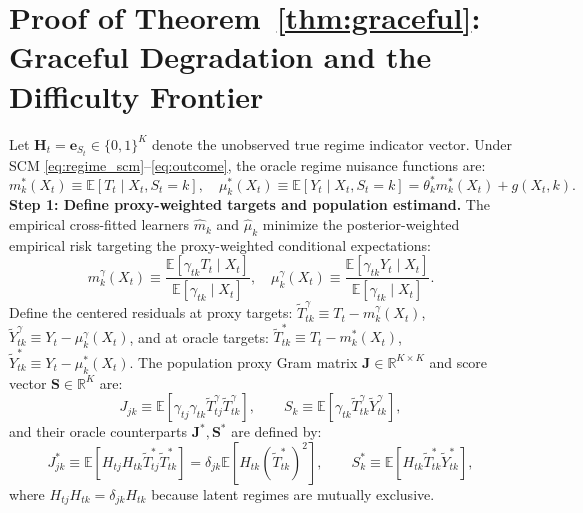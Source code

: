 \documentclass[twoside]{article}
\theoremstyle{definition}
\newcommand{\E}{\mathbb{E}}
\newcommand{\R}{\mathbb{R}}
\begin{document}
\section{Proof of Theorem~\ref{thm:graceful}: Graceful Degradation and the Difficulty Frontier}
\label{app:proof_thm3}
Let $\boldsymbol{H}_t = \boldsymbol{e}_{S_t} \in \{0, 1\}^K$ denote the unobserved true regime indicator vector.
Under SCM \eqref{eq:regime_scm}--\eqref{eq:outcome}, the oracle regime nuisance functions are:
\begin{equation}
    m_k^*(X_t) \equiv \E[T_t \mid X_t, S_t = k], \quad \mu_k^*(X_t) \equiv \E[Y_t \mid X_t, S_t = k] = \theta_k^* m_k^*(X_t) + g(X_t, k).
\end{equation}
\textbf{Step 1: Define proxy-weighted targets and population estimand.}
The empirical cross-fitted learners $\hat{m}_k$ and $\hat{\mu}_k$ minimize the posterior-weighted empirical risk targeting the proxy-weighted conditional expectations:
\begin{equation}
    m_k^\gamma(X_t) \equiv \frac{\E[\gamma_{tk} T_t \mid X_t]}{\E[\gamma_{tk} \mid X_t]}, \quad \mu_k^\gamma(X_t) \equiv \frac{\E[\gamma_{tk} Y_t \mid X_t]}{\E[\gamma_{tk} \mid X_t]}.
\end{equation}
Define the centered residuals at proxy targets: $\tilde{T}_{tk}^\gamma \equiv T_t - m_k^\gamma(X_t)$, $\tilde{Y}_{tk}^\gamma \equiv Y_t - \mu_k^\gamma(X_t)$, and at oracle targets: $\tilde{T}_{tk}^* \equiv T_t - m_k^*(X_t)$, $\tilde{Y}_{tk}^* \equiv Y_t - \mu_k^*(X_t)$.
The population proxy Gram matrix $\boldsymbol{J} \in \R^{K \times K}$ and score vector $\boldsymbol{S} \in \R^K$ are:
\begin{equation}
    J_{jk} \equiv \E[\gamma_{tj}\gamma_{tk} \tilde{T}_{tj}^\gamma \tilde{T}_{tk}^\gamma], \qquad S_k \equiv \E[\gamma_{tk} \tilde{T}_{tk}^\gamma \tilde{Y}_{tk}^\gamma],
\end{equation}
and their oracle counterparts $\boldsymbol{J}^*, \boldsymbol{S}^*$ are defined by:
\begin{equation}
    J_{jk}^* \equiv \E[H_{tj} H_{tk} \tilde{T}_{tj}^* \tilde{T}_{tk}^*] = \delta_{jk} \E[H_{tk} (\tilde{T}_{tk}^*)^2], \qquad S_k^* \equiv \E[H_{tk} \tilde{T}_{tk}^* \tilde{Y}_{tk}^*],
\end{equation}
where $H_{tj} H_{tk} = \delta_{jk} H_{tk}$ because latent regimes are mutually exclusive.
\end{document}
